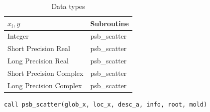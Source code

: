 \begin{table}[h]
\begin{center}
\begin{tabular}{ll}
\hline
$x_i, y$ & {\bf Subroutine}\\
\hline
Integer          & psb\_scatter \\
Short Precision Real & psb\_scatter \\
Long Precision Real & psb\_scatter \\
Short Precision Complex & psb\_scatter \\
Long Precision Complex & psb\_scatter \\
\hline
\end{tabular}
\end{center}
\caption{Data types\label{tab:scatter}}
\end{table}

\begin{lstlisting}
call psb_scatter(glob_x, loc_x, desc_a, info, root, mold)
\end{lstlisting}

